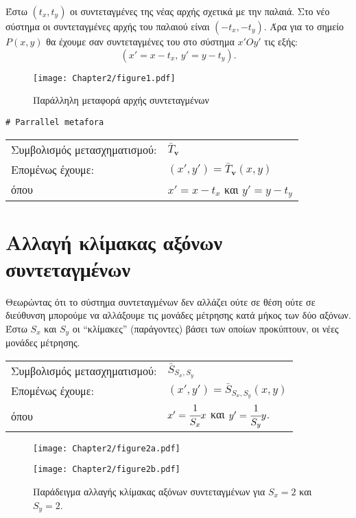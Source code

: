 Έστω \((t_x, t_y)\) οι συντεταγμένες της νέας αρχής σχετικά με την παλαιά. Στο νέο σύστημα οι συντεταγμένες αρχής του παλαιού είναι \((-t_x, -t_y)\). Άρα για το σημείο \(P(x, y)\) θα έχουμε σαν συντεταγμένες του στο σύστημα \(x'Oy'\) τις εξής:
%
\[
(x' = x - t_x, \, y' = y - t_y).
\]

\begin{figure}[hbt]
  \begin{center}
	\texttt{[image: Chapter2/figure1.pdf]}
  \end{center}
  \caption{Παράλληλη μεταφορά αρχής συντεταγμένων}
\end{figure}




\begin{lstlisting}
# Parrallel metafora	
\end{lstlisting}





\begin{tabular}{m{}m{}}
	Συμβολισμός μετασχηματισμού: & $ \bar{T}_\mathbf{v} $\\
	Επομένως έχουμε: & $(x', y') = \bar{T}_\mathbf{v}(x, y)$\\
	όπου & $x' = x - t_x$ και $y' = y - t_y$
\end{tabular}


\section{Αλλαγή κλίμακας αξόνων συντεταγμένων}

Θεωρώντας ότι το σύστημα συντεταγμένων δεν αλλάζει ούτε σε θέση ούτε σε διεύθυνση μπορούμε να αλλάξουμε τις μονάδες μέτρησης κατά μήκος των δύο αξόνων. Έστω $S_x$ και $S_y$ οι ``κλίμακες'' (παράγοντες) βάσει των οποίων προκύπτουν, οι νέες μονάδες μέτρησης.
 
 
\begin{tabular}{m{}m{}}
	Συμβολισμός μετασχηματισμού: & $ \bar{S}_{S_x, S_y}$\\
	Επομένως έχουμε: & $(x', y') = \bar{S}_{S_x, S_y}(x, y)$\\
	όπου & $x' = \cfrac{1}{S_x} x$ και $y' = \cfrac{1}{S_y} y$.
\end{tabular}


\begin{figure}[h!]
\begin{center}
	\begin{minipage}[b]{0.48\textwidth} %
	    \texttt{[image: Chapter2/figure2a.pdf]}
	\end{minipage}%
	\hfill
	\begin{minipage}[b]{0.48\textwidth} %
	    \texttt{[image: Chapter2/figure2b.pdf]}
	\end{minipage}
\end{center}
  \caption{Παράδειγμα αλλαγής κλίμακας αξόνων συντεταγμένων για $S_x = 2$ και $S_y = 2$.}
\end{figure}


